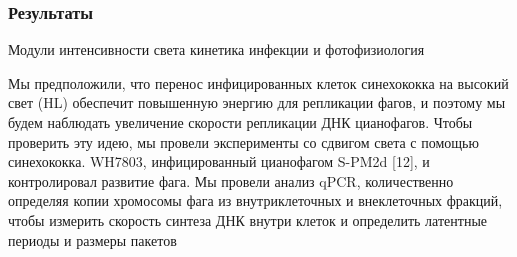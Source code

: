 \documentclass[a4paper,12pt]{article}
\begin{document}
    \subsubsection{Результаты}
        {\Large Модули интенсивности света кинетика инфекции и фотофизиология}
            \par{Мы предположили, что перенос инфицированных клеток синехококка на высокий свет (HL) обеспечит
            повышенную энергию для репликации фагов, и поэтому мы будем наблюдать увеличение скорости репликации ДНК
            цианофагов. Чтобы проверить эту идею, мы провели эксперименты со сдвигом света с помощью синехококка.
            WH7803, инфицированный цианофагом S-PM2d [12], и контролировал развитие фага. Мы провели анализ qPCR,
            количественно определяя копии хромосомы фага из внутриклеточных и внеклеточных фракций, чтобы измерить
            скорость синтеза ДНК внутри клеток и определить латентные периоды и размеры пакетов}
\end{document}
